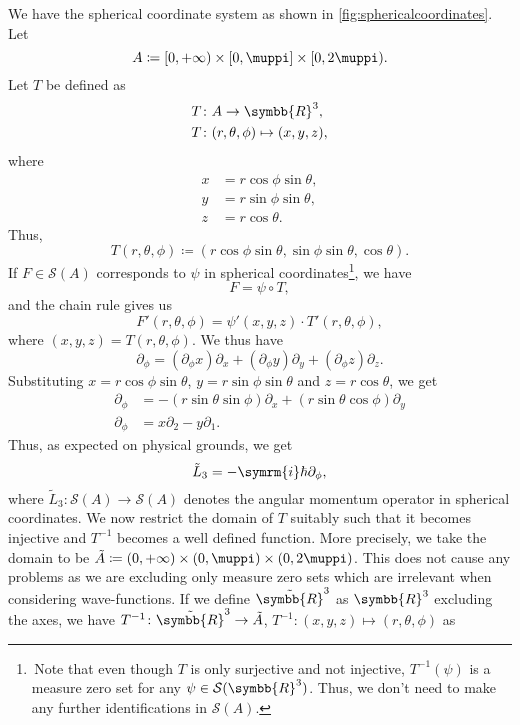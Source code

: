 \documentclass[12pt, a4 paper]{article}
\let\symcal\mathcal
\theoremstyle{definition}
\newcommand{\rthree}{\symbb{R}^3}
\newcommand{\rr}{\symbb{R}}
\newcommand{\schwartz}{\symcal{S}}
\newcommand{\schwartzrthree}{\schwartz(\rr^3)}
\renewcommand{\i}{\symrm{i}}
\renewcommand{\pi}{\muppi}
\begin{document}
    We have the spherical coordinate system as shown in \cref{fig:sphericalcoordinates}. Let
    \[
        A \coloneq [0, +\infty) \times [0,\pi] \times [0,2\pi).
    \]
    Let $T$ be defined as
    \begin{align*}
        T &\colon A \rightarrow \rthree,\\
        T &\colon (r, \theta, \phi) \mapsto (x, y, z),
    \end{align*}
    where
    \begin{align*}
        x &= r \cos{\phi} \sin{\theta},\\
        y &= r \sin{\phi} \sin{\theta},\\
        z &= r \cos{\theta}.
    \end{align*}
    Thus,
    \[
        T(r, \theta, \phi) \coloneq (r \cos{\phi} \sin{\theta}, \sin{\phi} \sin{\theta}, \cos{\theta}).
    \]
    If $F \in \schwartz(A)$ corresponds to $\psi$ in spherical coordinates\footnote{\,Note that even though $T$ is only surjective and not injective, $T^{-1}(\psi)$ is a measure zero set for any $\psi \in \schwartzrthree$. Thus, we don't need to make any further identifications in $\schwartz(A)$.}, we have
    \[
        F = \psi \circ T,
    \]
    and the chain rule gives us
    \[
        F'(r, \theta, \phi) = \psi'(x,y,z) \cdot T'(r, \theta, \phi),
    \]
    where $(x,y,z) = T(r, \theta, \phi)$. We thus have
    \[
        \partial_\phi = (\partial_\phi x)\partial_x + (\partial_\phi y)\partial_y + (\partial_\phi z)\partial_z.
    \]
    Substituting $x = r \cos{\phi} \sin{\theta}$, $y = r \sin{\phi} \sin{\theta}$ and $z = r \cos{\theta}$, we get
    \begin{align*}
        \partial_\phi &= -(r \sin{\theta} \sin{\phi})\partial_x + (r \sin{\theta} \cos{\phi})\partial_y\\
        \partial_\phi &= x\partial_2 - y\partial_1.
    \end{align*}
    Thus, as expected on physical grounds, we get
    \[
        \tilde{L}_3 = -\i\hbar\partial_\phi,
    \]
    where $\tilde{L}_3 \colon \schwartz(A) \rightarrow \schwartz(A)$ denotes the angular momentum operator in spherical coordinates.
    We now restrict the domain of $T$ suitably such that it becomes injective and $T^{-1}$ becomes a well defined function. More precisely, we take the domain to be $\tilde{A} \coloneq (0, +\infty) \times (0,\pi) \times (0,2\pi)$. This does not cause any problems as we are excluding only measure zero sets which are irrelevant when considering wave-functions. If we define $\tilde{\rr}^3$ as $\rthree$ excluding the axes, we have $T^{-1} \colon \tilde{\rr}^3 \rightarrow \tilde{A}$, $T^{-1} \colon (x, y, z) \mapsto (r, \theta, \phi)$ as
\end{document}
